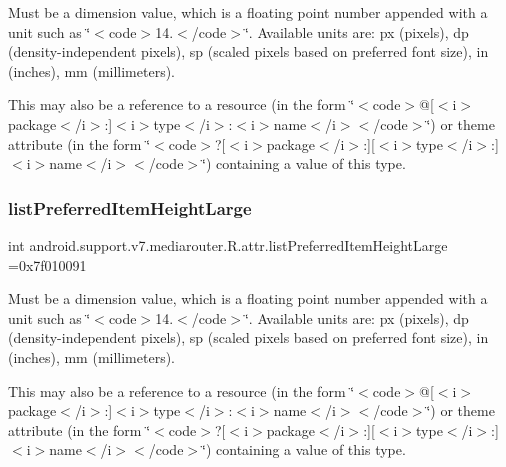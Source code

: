 Must be a dimension value, which is a floating point number appended with a unit such as \char`\"{}$<$code$>$14.\+5sp$<$/code$>$\char`\"{}. Available units are\+: px (pixels), dp (density-\/independent pixels), sp (scaled pixels based on preferred font size), in (inches), mm (millimeters). 

This may also be a reference to a resource (in the form \char`\"{}$<$code$>$@\mbox{[}$<$i$>$package$<$/i$>$\+:\mbox{]}$<$i$>$type$<$/i$>$\+:$<$i$>$name$<$/i$>$$<$/code$>$\char`\"{}) or theme attribute (in the form \char`\"{}$<$code$>$?\mbox{[}$<$i$>$package$<$/i$>$\+:\mbox{]}\mbox{[}$<$i$>$type$<$/i$>$\+:\mbox{]}$<$i$>$name$<$/i$>$$<$/code$>$\char`\"{}) containing a value of this type. \mbox{\label{classandroid_1_1support_1_1v7_1_1mediarouter_1_1R_1_1attr_a339cb47f5138891279e93ced966d6637}} 
\subsubsection{\texorpdfstring{list\+Preferred\+Item\+Height\+Large}{listPreferredItemHeightLarge}}
{\footnotesize\ttfamily int android.\+support.\+v7.\+mediarouter.\+R.\+attr.\+list\+Preferred\+Item\+Height\+Large =0x7f010091\hspace{0.3cm}{\ttfamily [static]}}

Must be a dimension value, which is a floating point number appended with a unit such as \char`\"{}$<$code$>$14.\+5sp$<$/code$>$\char`\"{}. Available units are\+: px (pixels), dp (density-\/independent pixels), sp (scaled pixels based on preferred font size), in (inches), mm (millimeters). 

This may also be a reference to a resource (in the form \char`\"{}$<$code$>$@\mbox{[}$<$i$>$package$<$/i$>$\+:\mbox{]}$<$i$>$type$<$/i$>$\+:$<$i$>$name$<$/i$>$$<$/code$>$\char`\"{}) or theme attribute (in the form \char`\"{}$<$code$>$?\mbox{[}$<$i$>$package$<$/i$>$\+:\mbox{]}\mbox{[}$<$i$>$type$<$/i$>$\+:\mbox{]}$<$i$>$name$<$/i$>$$<$/code$>$\char`\"{}) containing a value of this type. \mbox{\label{classandroid_1_1support_1_1v7_1_1mediarouter_1_1R_1_1attr_af8335a46023911148d7e44055b5afc03}} 

